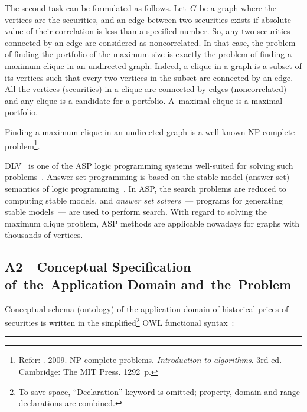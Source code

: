 \begin{multicols}{2}
{ The second task can be formulated as follows. Let~$G$ be a graph where the vertices
are the securities, and an edge between two securities exists if absolute value of their
correlation is less than a specified number. So, any two securities connected by an
edge are considered as noncorrelated. In that case, the problem of finding the
portfolio of the maximum size is exactly the problem of finding a maximum clique in
an undirected graph. Indeed, a clique in a graph is a subset of its vertices such that
every two vertices in the subset are connected by an edge. All the vertices (securities)
in a clique are connected by edges (noncorrelated) and any clique is a candidate for a
portfolio. A~maximal clique is a maximal portfolio.

  Finding a maximum clique in an undirected graph is a well-known NP-complete
problem\footnote{Refer: . 2009. NP-complete problems.
\textit{Introduction to algorithms}. 3rd ed. Cambridge: The MIT Press. 1292~p.
}. %

  DLV~\cite{9-kal} is one of the ASP logic programming systems well-suited for
solving such problems~\cite{24-kal}. Answer set programming is based on the stable model (answer set)
semantics of logic programming~\cite{26-kal}. In ASP, the search problems are
reduced to computing stable models, and \textit{answer set solvers}~--- programs for
generating stable models~--- are used to perform search. With regard to solving the maximum
clique problem, ASP methods are applicable nowadays for graphs with thousands of
vertices.

\subsection*{A2\ \ Conceptual Specification of~the~Application Domain
and~the~Problem}

  \noindent
  Conceptual schema (ontology) of the application domain of historical prices of
securities is written in the simplified\footnote{To save space, ``Declaration'' keyword
is omitted; property, domain and range declarations are combined.} OWL functional
syntax~\cite{28-kal}:
}
\end{multicols}

\hrule

